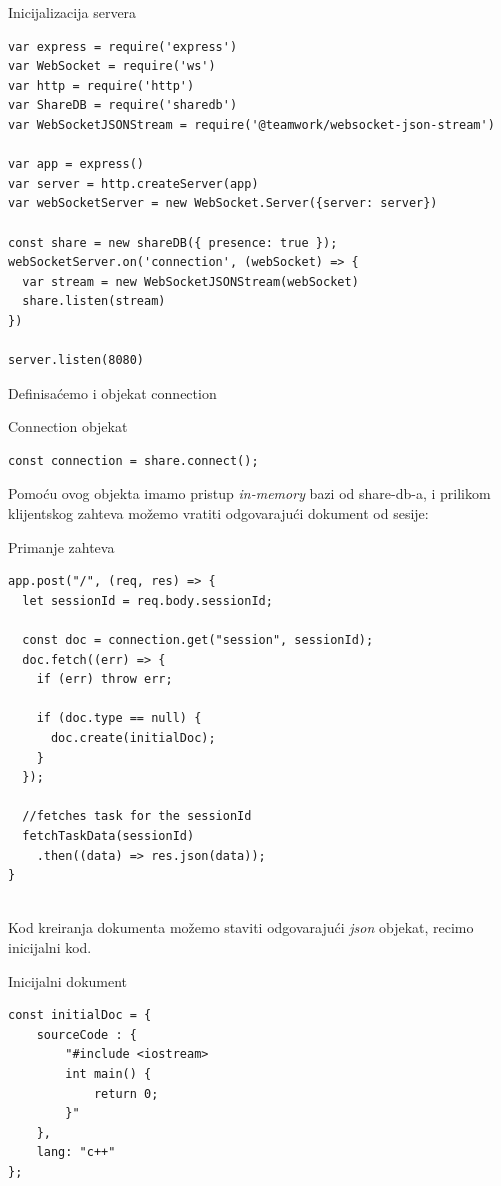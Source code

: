\documentclass[12pt]{article}
\begin{document}
\begin{mylisting}[label={lst:example}]{Inicijalizacija servera}
\begin{lstlisting}
var express = require('express')
var WebSocket = require('ws')
var http = require('http')
var ShareDB = require('sharedb')
var WebSocketJSONStream = require('@teamwork/websocket-json-stream')

var app = express()
var server = http.createServer(app)
var webSocketServer = new WebSocket.Server({server: server})

const share = new shareDB({ presence: true });
webSocketServer.on('connection', (webSocket) => {
  var stream = new WebSocketJSONStream(webSocket)
  share.listen(stream)
})

server.listen(8080)
\end{lstlisting}
\end{mylisting}


Definisaćemo i objekat connection
\begin{mylisting}[label={lst:example}]{Connection objekat}
\begin{lstlisting}
const connection = share.connect();
\end{lstlisting}
\end{mylisting}

Pomoću ovog objekta imamo pristup \textit{in-memory} bazi od share-db-a, i prilikom klijentskog zahteva možemo vratiti odgovarajući dokument od sesije:

\begin{mylisting}[label={lst:example}]{Primanje zahteva}
\begin{lstlisting}
app.post("/", (req, res) => {
  let sessionId = req.body.sessionId;
  
  const doc = connection.get("session", sessionId);
  doc.fetch((err) => {
    if (err) throw err;

    if (doc.type == null) {
      doc.create(initialDoc);
    }
  });

  //fetches task for the sessionId
  fetchTaskData(sessionId)
    .then((data) => res.json(data));
}
  
\end{lstlisting}
\end{mylisting}

Kod kreiranja dokumenta možemo staviti odgovarajući \textit{json} objekat, recimo inicijalni kod. 

\begin{mylisting}[label={lst:example}]{Inicijalni dokument}
\begin{lstlisting}
const initialDoc = {
    sourceCode : {
        "#include <iostream>
        int main() {
            return 0;
        }"
    },
    lang: "c++"
};
\end{lstlisting}
\end{mylisting}
\end{document}
